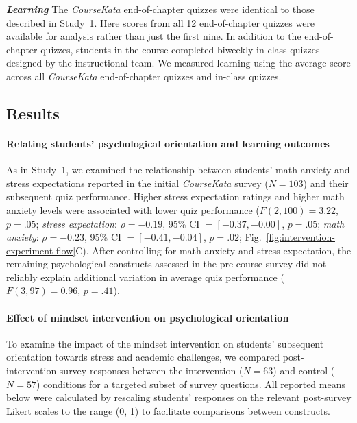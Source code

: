 \documentclass[10pt,letterpaper]{article}
\newcommand{\ck}{\textit{CourseKata}}
\begin{document}
\noindent \textbf{\textit{Learning}}
The \ck{} end-of-chapter quizzes were identical to those described in Study~1. 
Here scores from all 12 end-of-chapter quizzes were available for analysis rather than just the first nine.
In addition to the end-of-chapter quizzes, students in the course completed biweekly in-class quizzes designed by the instructional team. 
We measured learning using the average score across all \ck{} end-of-chapter quizzes and in-class quizzes.

\subsection{Results}

\paragraph{Relating students' psychological orientation and learning outcomes}

As in Study~1, we examined the relationship between students' math anxiety and stress expectations reported in the initial \ck{} survey ($N=103$) and their subsequent quiz performance. 
Higher stress expectation ratings and higher math anxiety levels were associated with lower quiz performance ($F(2,100)=3.22$, $p=.05$; \textit{stress expectation}: $\rho=-0.19$, 95\% CI $=[-0.37, -0.00]$, $p=.05$; \textit{math anxiety}: $\rho=-0.23$, 95\% CI $=[-0.41, -0.04]$, $p=.02$; Fig.~\ref{fig:intervention-experiment-flow}C).
After controlling for math anxiety and stress expectation, the remaining psychological constructs assessed in the pre-course survey did not reliably explain additional variation in average quiz performance ($F(3,97)=0.96$, $p=.41$). 

\paragraph{Effect of mindset intervention on psychological orientation}
To examine the impact of the mindset intervention on students' subsequent orientation towards stress and academic challenges, we compared post-intervention survey responses between the intervention ($N=63$) and control ($N=57$) conditions for a targeted subset of survey questions.
All reported means below were calculated by rescaling students' responses on the relevant post-survey Likert scales to the range (0, 1) to facilitate comparisons between constructs. 
\end{document}
